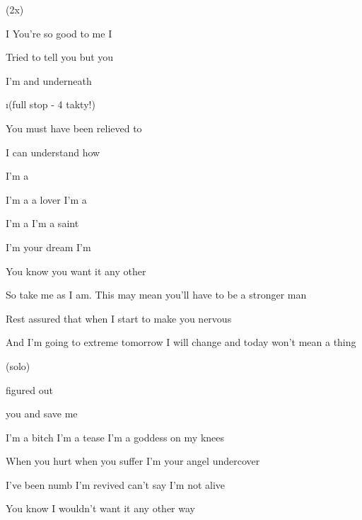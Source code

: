 
(2x)

   

\zs
I  You're so good to me I 

Tried to tell you but you 

I'm and  underneath 
 \ks

\i{(full stop - 4 takty!)}

\zs
{} You must have been relieved to 

I can understand how 

I'm a  
\ks

\zr
I'm a  a lover I'm a 

I'm a  I'm a saint 

I'm your  dream I'm 

You know you  want it any other 
\kr

\zs
So take me as I am. This may mean you'll have to be a stronger man

Rest assured that when I start to make you nervous

And I'm going to extreme tomorrow I will change and today won't mean a thing
\ks

\zr

\kr

\zr (solo) \kr

 figured out  

 you  and  save me

\zr
\kr

\zr
I'm a bitch I'm a tease I'm a goddess on my knees

When you hurt when you suffer I'm your angel undercover

I've been numb I'm revived can't say I'm not alive

You know I wouldn't want it any other way
\kr

        

      


\kp
